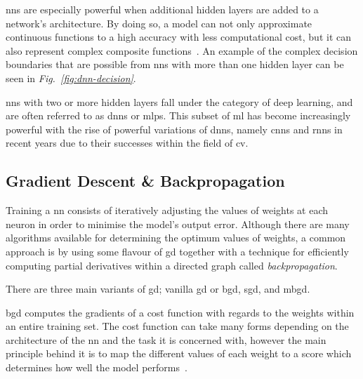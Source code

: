 \glspl{nn} are especially powerful when additional hidden layers are
added to a network's architecture. By doing so, a model can not only approximate continuous functions
to a high accuracy with less computational cost, but it can also represent complex composite 
functions~\citep{sapkota2020}. An example of the complex decision boundaries that are possible from
\glspl{nn} with more than one hidden layer can be seen in \textit{Fig.~\ref{fig:dnn-decision}}.

\glspl{nn} with two or more hidden layers fall under the category of deep learning, and are often referred to as
\Glspl{dnn} or \Glspl{mlp}. This subset
of \gls{ml} has become increasingly powerful with the rise of powerful variations of \glspl{dnn}, namely \Glspl{cnn} and \Glspl{rnn} in recent years
due to their successes within the field of \gls{cv}.

\subsection{Gradient Descent \& Backpropagation}
Training a \gls{nn} consists of iteratively adjusting the values of weights at
each neuron in order to minimise the model's output error. Although there
are many algorithms available for determining the optimum values of weights, a common approach
is by using some flavour of \Gls{gd} 
together with a technique for efficiently computing partial derivatives within a directed graph called \textit{backpropagation}.

There are three main variants of \gls{gd}; vanilla \gls{gd} or \Gls{bgd}, \Gls{sgd}, and \Gls{mbgd}.

\gls{bgd} computes the gradients of a cost function with regards to the weights within an entire training set.
The cost function can take many forms depending on the architecture of the \gls{nn} and the task it is concerned with,
however the main principle behind it is to map the different
values of each weight to a score which determines how well the model performs~\citep{shung2018}.

